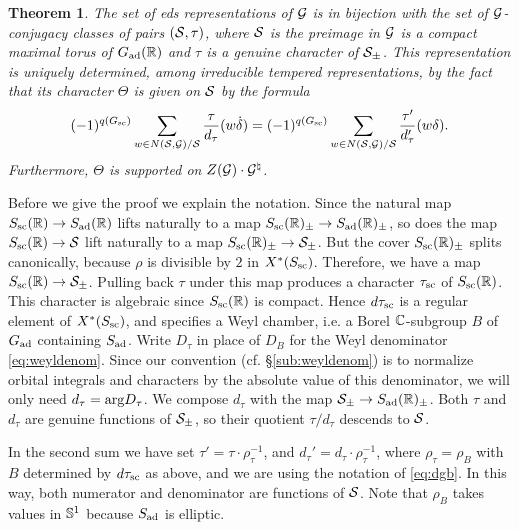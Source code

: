 \documentclass{article}
\newtheorem{thm}{Theorem}[subsection]
\theoremstyle{definition}
\numberwithin{equation}{section}
\renewcommand{\-}{\hyp{}}
\begin{document}
\begin{thm} \label{thm:eds}
The set of eds representations of $\mathcal{G}$ is in bijection with the set of $\mathcal{G}$-conjugacy classes of pairs $(\mathcal{S},\tau)$, where $\mathcal{S}$ is the preimage in $\mathcal{G}$ is a compact maximal torus of $G_{\textrm{ad}}(\mathbb{R})$ and $\tau$ is a genuine character of $\mathcal{S}_\pm$. This representation is uniquely determined, among irreducible tempered representations, by the fact that its character $\Theta$ is given on $\mathcal{S}$ by the formula
\begin{equation} \label{eq:charfmla}
		(-1)^{q(G_{\textrm{sc}})}\sum_{w \in N(\mathcal{S},\mathcal{G})/\mathcal{S}} \frac{\tau}{d_\tau}(w\dot\delta) = (-1)^{q(G_{\textrm{sc}})}\sum_{w \in N(\mathcal{S},\mathcal{G})/\mathcal{S}} \frac{\tau'}{d'_\tau}(w\delta).
\end{equation}
Furthermore, $\Theta$ is supported on $Z(\mathcal{G})\cdot \mathcal{G}^\natural$.
\end{thm}

Before we give the proof we explain the notation. Since the natural map $S_{\textrm{sc}}(\mathbb{R}) \to S_{\textrm{ad}}(\mathbb{R})$ lifts naturally to a map $S_{\textrm{sc}}(\mathbb{R})_\pm \to S_{\textrm{ad}}(\mathbb{R})_\pm$, so does the map $S_{\textrm{sc}}(\mathbb{R}) \to \mathcal{S}$ lift naturally to a map $S_{\textrm{sc}}(\mathbb{R})_\pm \to \mathcal{S}_\pm$. But the cover $S_{\textrm{sc}}(\mathbb{R})_\pm$ splits canonically, because $\rho$ is divisible by $2$ in $X^*(S_{\textrm{sc}})$. Therefore, we have a map $S_{\textrm{sc}}(\mathbb{R}) \to \mathcal{S}_\pm$. Pulling back $\tau$ under this map produces a character $\tau_{\textrm{sc}}$ of $S_{\textrm{sc}}(\mathbb{R})$. This character is algebraic since $S_{\textrm{sc}}(\mathbb{R})$ is compact. Hence $d\tau_{\textrm{sc}}$ is a regular element of $X^*(S_{\textrm{sc}})$, and specifies a Weyl chamber, i.e. a Borel $\mathbb{C}$-subgroup $B$ of $G_{\textrm{ad}}$ containing $S_{\textrm{ad}}$. Write $D_\tau$ in place of $D_B$ for the Weyl denominator \eqref{eq:weyldenom}. Since our convention (cf. \S\ref{sub:weyldenom}) is to normalize orbital integrals and characters by the absolute value of this denominator, we will only need $d_\tau=\textrm{arg}D_\tau$. We compose $d_\tau$ with the map $\mathcal{S}_\pm \to S_{\textrm{ad}}(\mathbb{R})_\pm$. Both $\tau$ and $d_\tau$ are genuine functions of $\mathcal{S}_\pm$, so their quotient $\tau/d_\tau$ descends to $\mathcal{S}$.

In the second sum we have set $\tau'=\tau \cdot \rho_\tau^{-1}$, and $d_\tau'=d_\tau \cdot \rho_\tau^{-1}$, where $\rho_\tau=\rho_B$ with $B$ determined by $d\tau_{\textrm{sc}}$ as above, and we are using the notation of \eqref{eq:dgb}. In this way, both numerator and denominator are functions of $\mathcal{S}$. Note that $\rho_B$ takes values in $\mathbb{S}^1$ because $S_{\textrm{ad}}$ is elliptic.
\end{document}
